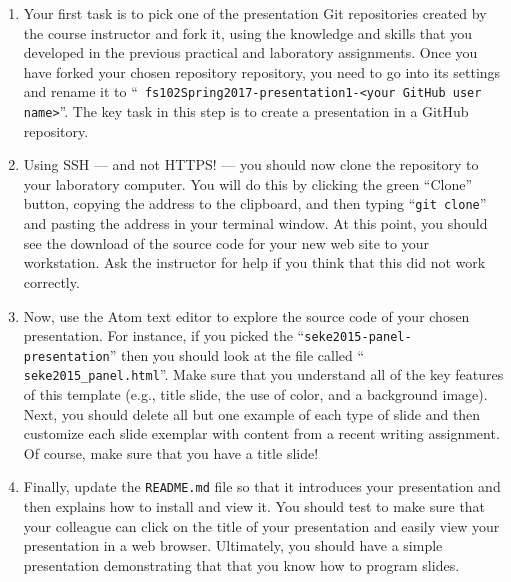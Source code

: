 \begin{enumerate}


  \item Your first task is to pick one of the presentation Git repositories created by the course instructor and fork
    it, using the knowledge and skills that you developed in the previous practical and laboratory assignments. Once you
    have forked your chosen repository repository, you need to go into its settings and rename it to ``{\tt
    fs102Spring2017-presentation1-<your GitHub user name>}''. The key task in this step is to create a presentation in a
    GitHub repository.

  \item Using SSH --- and not HTTPS! --- you should now clone the repository to your laboratory computer. You will do
    this by clicking the green ``Clone'' button, copying the address to the clipboard, and then typing ``{\tt git
    clone}'' and pasting the address in your terminal window. At this point, you should see the download of the source
    code for your new web site to your workstation. Ask the instructor for help if you think that this did not work
    correctly.

  \item Now, use the Atom text editor to explore the source code of your chosen presentation. For instance, if you
    picked the ``{\tt seke2015-panel-presentation}'' then you should look at the file called ``{\tt
    seke2015\_panel.html}''. Make sure that you understand all of the key features of this template (e.g., title slide,
    the use of color, and a background image). Next, you should delete all but one example of each type of slide and
    then customize each slide exemplar with content from a recent writing assignment. Of course, make sure that you have
    a title slide!

  \item Finally, update the {\tt README.md} file so that it introduces your presentation and then explains how to
    install and view it. You should test to make sure that your colleague can click on the title of your presentation
    and easily view your presentation in a web browser. Ultimately, you should have a simple presentation demonstrating
    that that you know how to program slides.

\end{enumerate}

